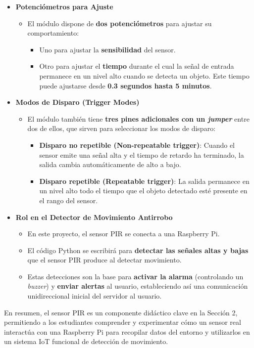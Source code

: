 \documentclass{report}
\begin{document}
\begin{itemize}
    \item \textbf{Potenciómetros para Ajuste}
    \begin{itemize}
        \item El módulo dispone de \textbf{dos potenciómetros} para ajustar su comportamiento:
        \begin{itemize}
            \item Uno para ajustar la \textbf{sensibilidad} del sensor.
            \item Otro para ajustar el \textbf{tiempo} durante el cual la señal de entrada permanece en un nivel alto cuando se detecta un objeto. Este 
            tiempo puede ajustarse desde \textbf{0.3 segundos hasta 5 minutos}.
        \end{itemize}
    \end{itemize}

    \item \textbf{Modos de Disparo (Trigger Modes)}
    \begin{itemize}
        \item El módulo también tiene \textbf{tres pines adicionales con un \textit{jumper}} entre dos de ellos, que sirven para seleccionar los modos de 
        disparo:
        \begin{itemize}
            \item \textbf{Disparo no repetible (Non-repeatable trigger)}: Cuando el sensor emite una señal alta y el tiempo de retardo ha terminado, la 
            salida cambia automáticamente de alto a bajo.
            \item \textbf{Disparo repetible (Repeatable trigger)}: La salida permanece en un nivel alto todo el tiempo que el objeto detectado esté presente 
            en el rango del sensor.
        \end{itemize}
    \end{itemize}

    \item \textbf{Rol en el Detector de Movimiento Antirrobo}
    \begin{itemize}
        \item En este proyecto, el sensor PIR se conecta a una Raspberry Pi.
        \item El código Python se escribirá para \textbf{detectar las señales altas y bajas} que el sensor PIR produce al detectar movimiento.
        \item Estas detecciones son la base para \textbf{activar la alarma} (controlando un \textit{buzzer}) y \textbf{enviar alertas} al usuario, 
        estableciendo así una comunicación unidireccional inicial del servidor al usuario.
    \end{itemize}
\end{itemize}
En resumen, el sensor PIR es un componente didáctico clave en la Sección 2, permitiendo a los estudiantes comprender y experimentar cómo un sensor 
real interactúa con una Raspberry Pi para recopilar datos del entorno y utilizarlos en un sistema IoT funcional de detección de movimiento.
\end{document}
